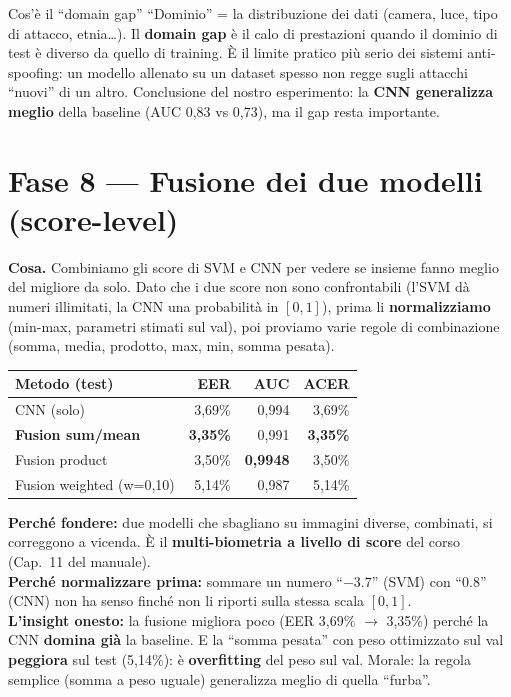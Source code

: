 \documentclass[11pt,a4paper]{article}
\newcommand{\say}[1]{``#1''}
\begin{document}
\begin{terminebox}{Cos'\`e il \say{domain gap}}
\say{Dominio} = la distribuzione dei dati (camera, luce, tipo di attacco, etnia\dots). Il
\textbf{domain gap} \`e il calo di prestazioni quando il dominio di test \`e diverso da quello di
training. \`E il limite pratico pi\`u serio dei sistemi anti-spoofing: un modello allenato su un
dataset spesso non regge sugli attacchi \say{nuovi} di un altro. Conclusione del nostro
esperimento: la \textbf{CNN generalizza meglio} della baseline (AUC 0,83 vs 0,73), ma il gap
resta importante.
\end{terminebox}

\section{Fase 8 --- Fusione dei due modelli (score-level)}
\textbf{Cosa.} Combiniamo gli score di SVM e CNN per vedere se insieme fanno meglio del migliore
da solo. Dato che i due score non sono confrontabili (l'SVM d\`a numeri illimitati, la CNN una
probabilit\`a in $[0,1]$), prima li \textbf{normalizziamo} (min-max, parametri stimati sul val),
poi proviamo varie regole di combinazione (somma, media, prodotto, max, min, somma pesata).

\begin{center}
\small
\begin{tabular}{@{}lrrr@{}}
\toprule
\textbf{Metodo (test)} & \textbf{EER} & \textbf{AUC} & \textbf{ACER} \\
\midrule
CNN (solo)                  & 3,69\% & 0,994  & 3,69\% \\
\textbf{Fusion sum/mean}    & \textbf{3,35\%} & 0,991  & \textbf{3,35\%} \\
Fusion product             & 3,50\% & \textbf{0,9948} & 3,50\% \\
Fusion weighted (w=0,10)   & 5,14\% & 0,987  & 5,14\% \\
\bottomrule
\end{tabular}
\end{center}

\begin{perchebox}
\textbf{Perch\'e fondere:} due modelli che sbagliano su immagini diverse, combinati, si
correggono a vicenda. \`E il \textbf{multi-biometria a livello di score} del corso (Cap.\ 11 del
manuale).\\[4pt]
\textbf{Perch\'e normalizzare prima:} sommare un numero \say{$-3.7$} (SVM) con \say{$0.8$} (CNN)
non ha senso finch\'e non li riporti sulla stessa scala $[0,1]$.\\[4pt]
\textbf{L'insight onesto:} la fusione migliora poco (EER 3,69\% $\rightarrow$ 3,35\%) perch\'e la
CNN \textbf{domina gi\`a} la baseline. E la \say{somma pesata} con peso ottimizzato sul val
\textbf{peggiora} sul test (5,14\%): \`e \textbf{overfitting} del peso sul val. Morale: la regola
semplice (somma a peso uguale) generalizza meglio di quella \say{furba}.
\end{perchebox}
\end{document}

